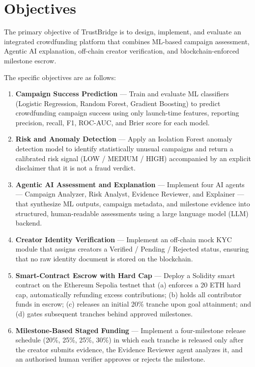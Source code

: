 \chapter{Objectives}

The primary objective of TrustBridge is to design, implement, and evaluate an integrated crowdfunding platform that combines ML-based campaign assessment, Agentic AI explanation, off-chain creator verification, and blockchain-enforced milestone escrow.

The specific objectives are as follows:

\begin{enumerate}

    \item \textbf{Campaign Success Prediction} — Train and evaluate ML classifiers (Logistic Regression, Random Forest, Gradient Boosting) to predict crowdfunding campaign success using only launch-time features, reporting precision, recall, F1, ROC-AUC, and Brier score for each model.

    \item \textbf{Risk and Anomaly Detection} — Apply an Isolation Forest anomaly detection model to identify statistically unusual campaigns and return a calibrated risk signal (LOW / MEDIUM / HIGH) accompanied by an explicit disclaimer that it is not a fraud verdict.

    \item \textbf{Agentic AI Assessment and Explanation} — Implement four AI agents — Campaign Analyzer, Risk Analyst, Evidence Reviewer, and Explainer — that synthesize ML outputs, campaign metadata, and milestone evidence into structured, human-readable assessments using a large language model (LLM) backend.

    \item \textbf{Creator Identity Verification} — Implement an off-chain mock KYC module that assigns creators a Verified / Pending / Rejected status, ensuring that no raw identity document is stored on the blockchain.

    \item \textbf{Smart-Contract Escrow with Hard Cap} — Deploy a Solidity smart contract on the Ethereum Sepolia testnet that (a) enforces a 20 ETH hard cap, automatically refunding excess contributions; (b) holds all contributor funds in escrow; (c) releases an initial 20\% tranche upon goal attainment; and (d) gates subsequent tranches behind approved milestones.

    \item \textbf{Milestone-Based Staged Funding} — Implement a four-milestone release schedule (20\%, 25\%, 25\%, 30\%) in which each tranche is released only after the creator submits evidence, the Evidence Reviewer agent analyzes it, and an authorised human verifier approves or rejects the milestone.


\end{enumerate}
